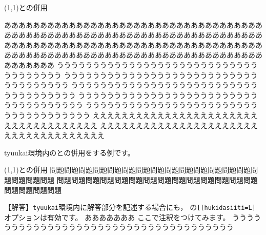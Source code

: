 \begin{showEx}(1,1){との併用}
\begin{breakRline}[fboxsep=10pt,sensyu=\protect\drawline]
ああああああああああああああああああああああああああああああああああああ
ああああああああああああああああああああああああああああああああああああ
ああああああああああああああああああああああああああああああああああああ
ああああああああああああああああああああああああああああああああああああ
あああああああ%
%
うううううううううううううううううううううううううううううううううううう
うううううううううううううううううううううううううううううううううううう
うううううううううううううううううううううううううううううううううううう
うううううううううううううううううううううううううううううううううううう
うううううううううううううううううううううううううううううううううううう
ええええええええええええええええええええええええええええええええええええ
ええええええええええええええええええええええええええええええええええええ
\end{breakRline}
\end{showEx}

\textsf{tyuukai}環境内のとの併用をする例です。

\begin{showEx}(1,1){との併用}
問題問題問題問題問題問題問題問題問題問題問題問題問題問題問題問題問題問題
問題問題問題問題問題問題問題問題問題問題問題問題問題問題問題問題問題問題

\migityuukeisenfalse
\begin{tyuukai}
\tyuumark{}%
【解答】\verb+tyuukai+環境内に解答部分を記述する場合にも，
の\verb+[[hukidasiiti=L]+オプションは有効です。
あああああああ
%
ここで注釈をつけてみます。
うううううううううううううううううううううううううううううううううううう
\end{tyuukai}
\end{showEx}

